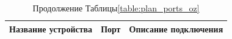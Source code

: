 \begin{table}[H]
    \centering
	\caption{Продолжение Таблицы\;\ref{table:plan_ports_oz}}
    \small
	\begin{tabularx}{\textwidth}{|X|X|X|}
        \hline
		Название устройства& Порт&Описание подключения \\
        \hline

\end{tabularx}
\end{table}
